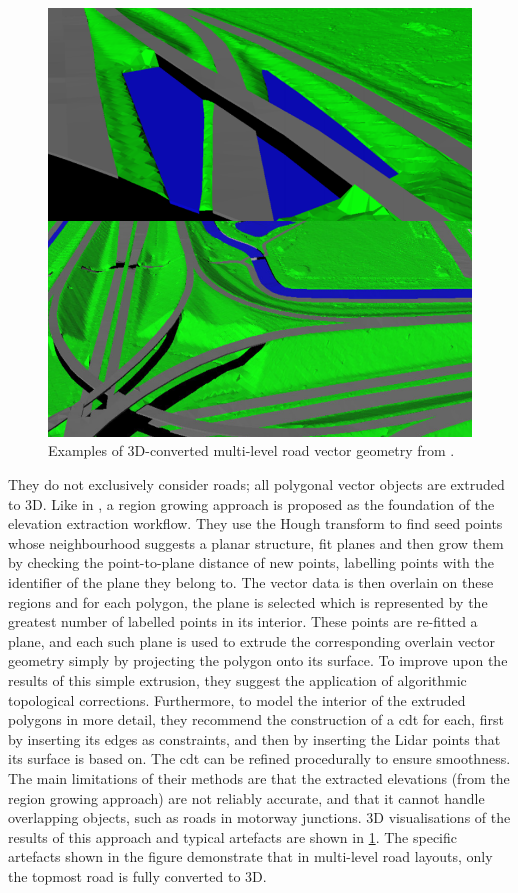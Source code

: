 \begin{figure}
    \includegraphics[width=\linewidth]{final_report/figs/oudeElberink_vosselman_2006_03.png} 
    \caption{Examples of 3D-converted multi-level road vector geometry from \cite{oudeElberink_vosselman_2006}.}
    \label{fig:conversionartefacts}
\end{figure}

They do not exclusively consider roads; all polygonal vector objects are extruded to 3D. Like in \cite{hatger_brenner_2003}, a region growing approach is proposed as the foundation of the elevation extraction workflow. They use the Hough transform to find seed points whose neighbourhood suggests a planar structure, fit planes and then grow them by checking the point-to-plane distance of new points, labelling points with the identifier of the plane they belong to. The vector data is then overlain on these regions and for each polygon, the plane is selected which is represented by the greatest number of labelled points in its interior. These points are re-fitted a plane, and each such plane is used to extrude the corresponding overlain vector geometry simply by projecting the polygon onto its surface. To improve upon the results of this simple extrusion, they suggest the application of algorithmic topological corrections. Furthermore, to model the interior of the extruded polygons in more detail, they recommend the construction of a \ac{cdt} for each, first by inserting its edges as constraints, and then by inserting the Lidar points that its surface is based on. The \ac{cdt} can be refined procedurally to ensure smoothness. The main limitations of their methods are that the extracted elevations (from the region growing approach) are not reliably accurate, and that it cannot handle overlapping objects, such as roads in motorway junctions. 3D visualisations of the results of this approach and typical artefacts are shown in \ref{fig:conversionartefacts}. The specific artefacts shown in the figure demonstrate that in multi-level road layouts, only the topmost road is fully converted to 3D.

